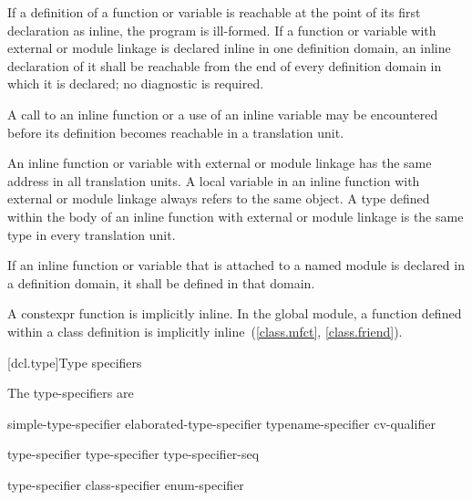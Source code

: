 \pnum
If a definition of a function or variable is reachable
at the point of its
first declaration as inline, the program is ill-formed. If a function or variable
with external or module linkage
is declared inline in one definition domain,
an inline declaration of it shall be reachable
from the end of every definition domain in which it is declared;
no diagnostic is required.
\begin{note}
A call to an inline function or a use of an inline variable may be encountered
before its definition becomes reachable in a translation unit.
\end{note}

\pnum
\begin{note}
An inline function or variable
with external or module linkage
has the same address in all translation units.
A  local variable in an inline
function with external or module linkage
always refers to the same object.
A type defined within the body of an inline
function with external or module linkage is the
same type in every translation unit.
\end{note}

\pnum
If an inline function or variable that is attached to a named module
is declared in a definition domain,
it shall be defined in that domain.
\begin{note}
A constexpr function is implicitly inline.
In the global module, a function defined within a class definition
is implicitly inline~(\ref{class.mfct}, \ref{class.friend}).
\end{note}

[dcl.type]{Type specifiers}%

\pnum
The type-specifiers are
%
%
%
\begin{bnf}
\br
  simple-type-specifier\br
  elaborated-type-specifier\br
  typename-specifier\br
  cv-qualifier
\end{bnf}

\begin{bnf}
\br
    type-specifier \br
    type-specifier type-specifier-seq
\end{bnf}

\begin{bnf}
\br
    type-specifier\br
    class-specifier\br
    enum-specifier
\end{bnf}

